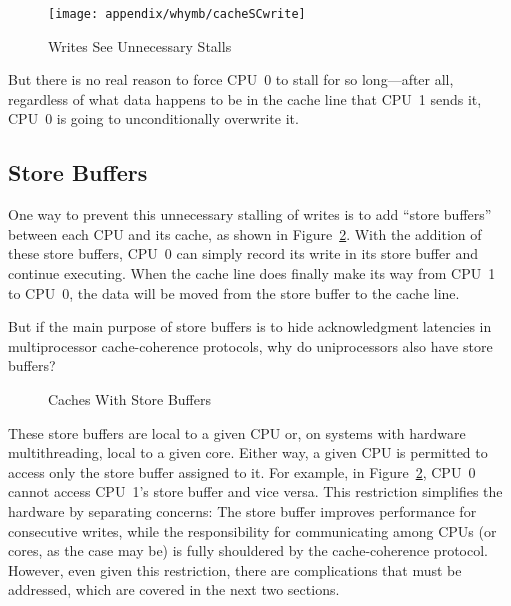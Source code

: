 \begin{figure}[htb]
\centering
\texttt{[image: appendix/whymb/cacheSCwrite]}
\caption{Writes See Unnecessary Stalls}
\label{fig:app:whymb:Writes See Unnecessary Stalls}
\end{figure}

But there is no real reason to force CPU~0 to stall for so long---after
all, regardless of what data happens to be in the cache line that CPU~1
sends it, CPU~0 is going to unconditionally overwrite it.

\subsection{Store Buffers}
\label{sec:app:whymb:Store Buffers}

One way to prevent this unnecessary stalling of writes is to add
``store buffers'' between each CPU and its cache, as shown in
Figure~\ref{fig:app:whymb:Caches With Store Buffers}.
With the addition of these store buffers, CPU~0 can simply record
its write in its store buffer and continue executing.
When the cache line does finally make its way from CPU~1 to CPU~0,
the data will be moved from the store buffer to the cache line.

\QuickQuiz{}
	But if the main purpose of store buffers is to hide acknowledgment
	latencies in multiprocessor cache-coherence protocols, why
	do uniprocessors also have store buffers?
 \QuickQuizEnd

\begin{figure}[htb]
\centering
{}
\caption{Caches With Store Buffers}
\label{fig:app:whymb:Caches With Store Buffers}
\end{figure}

These store buffers are local to a given CPU or, on systems with
hardware multithreading, local to a given core.
Either way, a given CPU is permitted to access only the store buffer
assigned to it.
For example, in
Figure~\ref{fig:app:whymb:Caches With Store Buffers}, CPU~0 cannot
access CPU~1's store buffer and vice versa.
This restriction simplifies the hardware by separating concerns:
The store buffer improves performance for consecutive writes, while
the responsibility for communicating among CPUs (or cores, as the
case may be) is fully shouldered by the cache-coherence protocol.
However, even given this restriction, there are complications that must
be addressed, which are covered in the next two sections.

